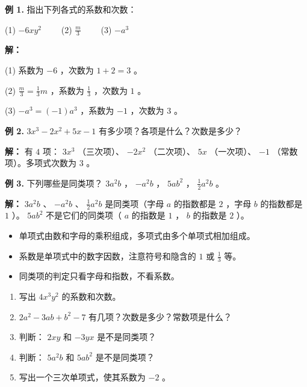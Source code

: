 \begin{workedexamples}


\textbf{例 1.} 指出下列各式的系数和次数：

(1) $-6xy^2$ 　　(2) $\frac{m}{3}$ 　　(3) $-a^3$

\textbf{解：}

(1) 系数为 $-6$ ，次数为 $1 + 2 = 3$ 。

(2) $\frac{m}{3} = \frac{1}{3}m$ ，系数为 $\frac{1}{3}$ ，次数为 $1$ 。

(3) $-a^3 = (-1)a^3$ ，系数为 $-1$ ，次数为 $3$ 。

\textbf{例 2.} $3x^3 - 2x^2 + 5x - 1$ 有多少项？各项是什么？次数是多少？

\textbf{解：} 有 $4$ 项： $3x^3$ （三次项）、 $-2x^2$ （二次项）、 $5x$ （一次项）、 $-1$ （常数项）。多项式次数为 $3$ 。

\textbf{例 3.} 下列哪些是同类项？ $3a^2b$ ， $-a^2b$ ， $5ab^2$ ， $\frac{1}{2}a^2b$ 。

\textbf{解：} $3a^2b$ 、 $-a^2b$ 、 $\frac{1}{2}a^2b$ 是同类项（字母 $a$ 的指数都是 $2$ ，字母 $b$ 的指数都是 $1$ ）。 $5ab^2$ 不是它们的同类项（ $a$ 的指数是 $1$ ， $b$ 的指数是 $2$ ）。

\end{workedexamples}

\begin{keytakeaway}


\begin{itemize}
  \item 单项式由数和字母的乘积组成，多项式由多个单项式相加组成。
  \item 系数是单项式中的数字因数，注意符号和隐含的 $1$ 或 $\frac{1}{3}$ 等。
  \item 同类项的判定只看字母和指数，不看系数。
\end{itemize}


\end{keytakeaway}

\begin{practice}


\begin{enumerate}
  \item 写出 $4x^3y^2$ 的系数和次数。
  \item $2a^2 - 3ab + b^2 - 7$ 有几项？次数是多少？常数项是什么？
  \item 判断： $2xy$ 和 $-3yx$ 是不是同类项？
  \item 判断： $5a^2b$ 和 $5ab^2$ 是不是同类项？
  \item 写出一个三次单项式，使其系数为 $-2$ 。
\end{enumerate}


\end{practice}


